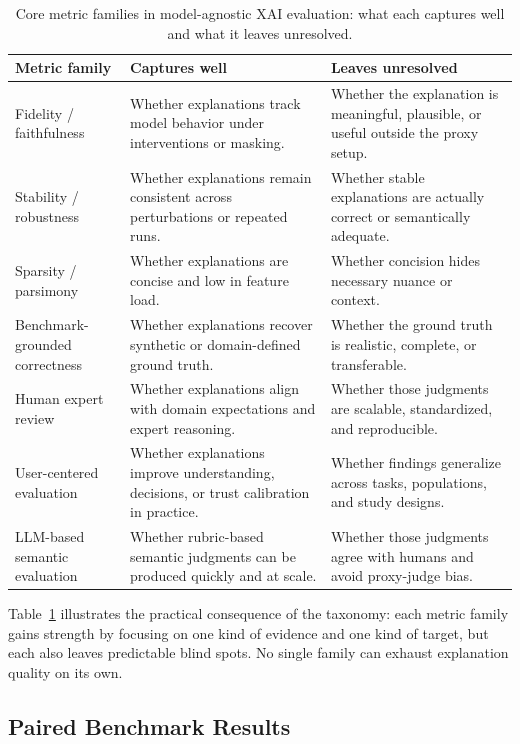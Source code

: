 \documentclass[fleqn,10pt,lineno]{wlpeerj}
\begin{document}
\begin{table}[t]
\centering
\caption{Core metric families in model-agnostic XAI evaluation: what
each captures well and what it leaves unresolved.}
\footnotesize
\begin{tabularx}{\linewidth}{l X X}
\toprule
\textbf{Metric family} & \textbf{Captures well} & \textbf{Leaves unresolved} \\
\midrule
Fidelity / faithfulness & Whether explanations track model behavior under interventions or masking. & Whether the explanation is meaningful, plausible, or useful outside the proxy setup. \\
Stability / robustness & Whether explanations remain consistent across perturbations or repeated runs. & Whether stable explanations are actually correct or semantically adequate. \\
Sparsity / parsimony & Whether explanations are concise and low in feature load. & Whether concision hides necessary nuance or context. \\
Benchmark-grounded correctness & Whether explanations recover synthetic or domain-defined ground truth. & Whether the ground truth is realistic, complete, or transferable. \\
Human expert review & Whether explanations align with domain expectations and expert reasoning. & Whether those judgments are scalable, standardized, and reproducible. \\
User-centered evaluation & Whether explanations improve understanding, decisions, or trust calibration in practice. & Whether findings generalize across tasks, populations, and study designs. \\
LLM-based semantic evaluation & Whether rubric-based semantic judgments can be produced quickly and at scale. & Whether those judgments agree with humans and avoid proxy-judge bias. \\
\bottomrule
\end{tabularx}
\label{tab:taxonomy_families}
\end{table}

Table~\ref{tab:taxonomy_families} illustrates the practical consequence of
the taxonomy: each metric family gains strength by focusing on one kind
of evidence and one kind of target, but each also leaves predictable
blind spots. No single family can exhaust explanation quality on its own.


\subsection{Paired Benchmark Results}
\label{sec:results}
\end{document}
